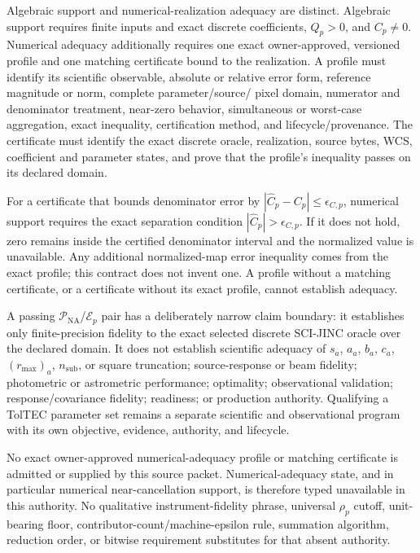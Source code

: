 \documentclass[11pt]{article}
\begin{document}
Algebraic support and numerical-realization adequacy are distinct.  Algebraic
support requires finite inputs and exact discrete coefficients, $Q_p>0$, and
$C_p\ne0$.  Numerical adequacy additionally requires one exact
owner-approved, versioned profile and one matching certificate bound to the
realization.  A profile must identify its scientific observable, absolute or
relative error form, reference magnitude or norm, complete parameter/source/
pixel domain, numerator and denominator treatment, near-zero behavior,
simultaneous or worst-case aggregation, exact inequality, certification
method, and lifecycle/provenance.  The certificate must identify the exact
discrete oracle, realization, source bytes, WCS, coefficient and parameter
states, and prove that the profile's inequality passes on its declared domain.

For a certificate that bounds denominator error by
$|\widehat C_p-C_p|\le\epsilon_{C,p}$, numerical support requires the exact
separation condition $|\widehat C_p|>\epsilon_{C,p}$.  If it does not hold,
zero remains inside the certified denominator interval and the normalized
value is unavailable.  Any additional normalized-map error inequality comes
from the exact profile; this contract does not invent one.  A profile without
a matching certificate, or a certificate without its exact profile, cannot
establish adequacy.

A passing $\mathcal P_{\mathrm{NA}}$/$\mathcal E_p$ pair has a deliberately
narrow claim boundary: it establishes only finite-precision fidelity to the
exact selected discrete SCI-JINC oracle over the declared domain.  It does
not establish scientific adequacy of $s_a$, $a_a$, $b_a$, $c_a$,
$(r_{\max})_a$, $n_{\mathrm{sub}}$, or square truncation; source-response or
beam fidelity; photometric or astrometric performance; optimality;
observational validation; response/covariance fidelity; readiness; or
production authority.  Qualifying a TolTEC parameter set remains a separate
scientific and observational program with its own objective, evidence,
authority, and lifecycle.

No exact owner-approved numerical-adequacy profile or matching certificate is
admitted or supplied by this source packet.  Numerical-adequacy state, and in
particular numerical near-cancellation support, is therefore typed
unavailable in this authority.  No qualitative instrument-fidelity phrase,
universal $\rho_p$ cutoff, unit-bearing floor, contributor-count/machine-epsilon rule,
summation algorithm, reduction order, or bitwise requirement substitutes for
that absent authority.
\end{document}

